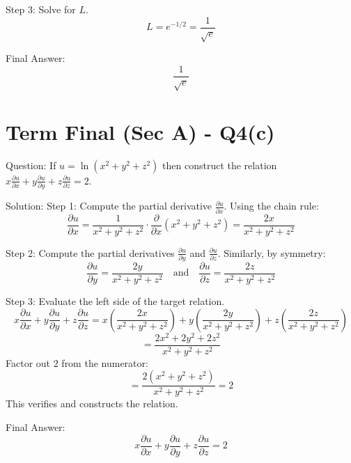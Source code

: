 \documentclass{article}
\begin{document}
Step 3: Solve for $L$.
\[
L = e^{-1/2} = \frac{1}{\sqrt{e}}
\]

Final Answer:
\[
\boxed{\frac{1}{\sqrt{e}}}
\]

\section*{Term Final (Sec A) - Q4(c)}
Question:
If $u = \ln(x^2 + y^2 + z^2)$ then construct the relation $x\frac{\partial u}{\partial x} + y\frac{\partial u}{\partial y} + z\frac{\partial u}{\partial z} = 2$.

Solution:
Step 1: Compute the partial derivative $\frac{\partial u}{\partial x}$.
Using the chain rule:
\[
\frac{\partial u}{\partial x} = \frac{1}{x^2+y^2+z^2} \cdot \frac{\partial}{\partial x}(x^2+y^2+z^2) = \frac{2x}{x^2+y^2+z^2}
\]

Step 2: Compute the partial derivatives $\frac{\partial u}{\partial y}$ and $\frac{\partial u}{\partial z}$.
Similarly, by symmetry:
\[
\frac{\partial u}{\partial y} = \frac{2y}{x^2+y^2+z^2} \quad \text{and} \quad \frac{\partial u}{\partial z} = \frac{2z}{x^2+y^2+z^2}
\]

Step 3: Evaluate the left side of the target relation.
\[
x\frac{\partial u}{\partial x} + y\frac{\partial u}{\partial y} + z\frac{\partial u}{\partial z} = x\left(\frac{2x}{x^2+y^2+z^2}\right) + y\left(\frac{2y}{x^2+y^2+z^2}\right) + z\left(\frac{2z}{x^2+y^2+z^2}\right)
\]
\[
= \frac{2x^2 + 2y^2 + 2z^2}{x^2+y^2+z^2}
\]
Factor out $2$ from the numerator:
\[
= \frac{2(x^2+y^2+z^2)}{x^2+y^2+z^2} = 2
\]
This verifies and constructs the relation.

Final Answer:
\[
\boxed{x\frac{\partial u}{\partial x} + y\frac{\partial u}{\partial y} + z\frac{\partial u}{\partial z} = 2}
\]
\end{document}
